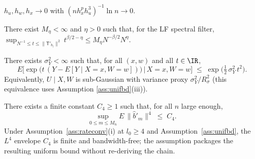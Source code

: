 \begin{assumption}\label{ass:app5}
$h_u, h_w, h_x \to 0$ with $(n h_x^p h_u^3)^{-1} \ln n \to 0$.
\end{assumption}

\begin{assumption}[LF qualification]\label{ass:app6}
There exist $M_\eta < \infty$ and $\eta > 0$ such that, for the LF spectral
filter, $\sup_{N^{-1} \le t \le \|\mathsf T'_{b_\dagger}\|^2}
t^{\beta/2 - \eta} \le M_\eta N^{-\beta/2} N^\eta$.
\end{assumption}


\begin{assumption}\label{ass:subgauss}
There exists $\sigma_Y^2 < \infty$ such that, for all $(x,w)$ and all
$t \in \IR$,
\[
E\!\bigl[\exp\bigl(t\,(Y - E[Y \mid X = x, W = w])\bigr) \,\big|\, X = x, W = w\bigr]
\;\le\; \exp\!\bigl(\tfrac12\,\sigma_Y^2\, t^2\bigr).
\]
Equivalently, $U \mid X, W$ is sub-Gaussian with variance proxy
$\sigma_Y^2 / R_\sigma^2$ (this equivalence uses Assumption
\ref{ass:unifbd}\textup{(iii)}).
\end{assumption}


\begin{assumption}\label{ass:iterbd}
There exists a finite constant $C_4 \ge 1$ such that, for all $n$ large enough,
\[
\sup_{0 \le m \le M_n} E\,\bigl\|\hat b'_m\bigr\|^4 \;\le\; C_4.
\]
Under Assumption~\ref{ass:rateconv}\textup{(i)} at $l_0 \ge 4$ and
Assumption~\ref{ass:unifbd}, the $L^4$ envelope $C_4$ is finite and
bandwidth-free; the assumption packages the resulting uniform bound
without re-deriving the chain.
\end{assumption}

